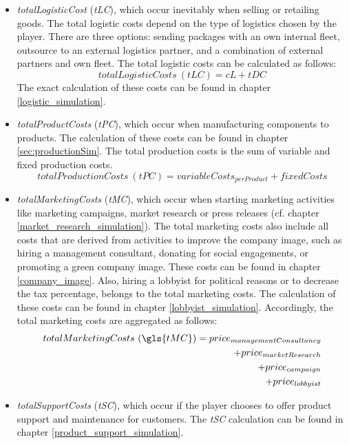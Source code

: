 \begin{itemize}
    \item \textit{totalLogisticCost} (\textit{tLC}), which occur inevitably when selling or retailing goods. The total logistic costs depend on the type of logistics chosen by the player. There are three options: sending packages with an own internal fleet, outsource to an external logistics partner, and a combination of external partners and own fleet. The total logistic costs can be calculated as follows:
    \begin{equation} 
        totalLogisticCosts~(tLC) = cL + tDC
    \end{equation}
    The exact calculation of these costs can be found in chapter \ref{logistic_simulation}.
    \item \textit{totalProductCosts} (\textit{tPC}), which occur when manufacturing components to products. The calculation of these costs can be found in chapter \ref{sec:productionSim}. The total production costs is the sum of variable and fixed production costs.
   \begin{equation}
       totalProductionCosts~(tPC) = variableCosts_{perProduct} + fixedCosts
   \end{equation}
    \item \textit{totalMarketingCosts} (\textit{tMC}), which occur when starting marketing activities like marketing campaigns, market research or press releases (cf. chapter \ref{market_research_simulation}). The total marketing costs also include all costs that are derived from activities to improve the company image, such as hiring a management consultant, donating for social engagements, or promoting a green company image. These costs can be found in chapter \ref{company_image}. Also, hiring a lobbyist for political reasons or to decrease the tax percentage, belongs to the total marketing costs. The calculation of these costs can be found in chapter \ref{lobbyist_simulation}. Accordingly, the total marketing costs are aggregated as follows:
    \begin{equation}
    \begin{split}
        totalMarketingCosts~ (\gls{tMC}) = price_{managementConsultancy} \\
        + price_{marketResearch} \\
        + price_{campaign} \\
        + price_{lobbyist} \\
    \end{split}
    \end{equation}
    \item \textit{totalSupportCosts} (\textit{tSC}), which occur if the player chooses to offer product support and maintenance for customers. The \textit{tSC} calculation can be found in chapter \ref{product_support_simulation}.
\end{itemize}

